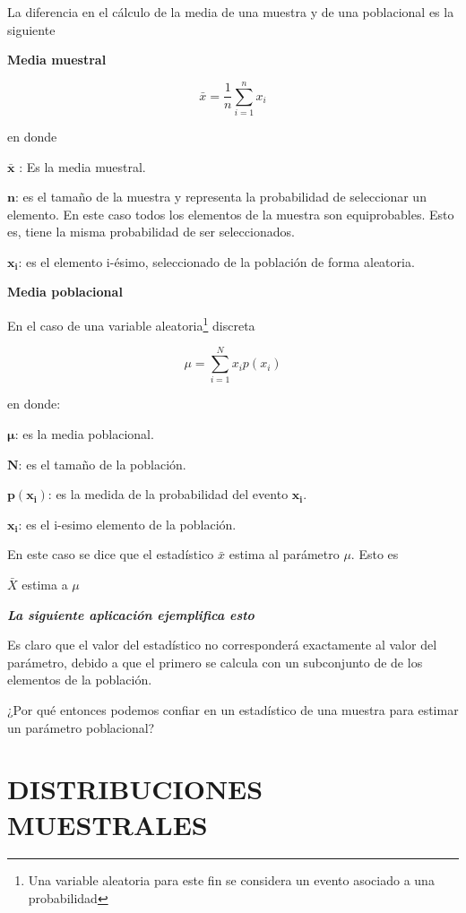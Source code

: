 \documentclass[
  oneside]{book}
\begin{document}
La diferencia en el cálculo de la media de una muestra y de una poblacional es la siguiente

\textbf{Media muestral}

\begin{equation}
\bar{x}=\frac{1}{n}\sum_{i=1}^{n}x_i
\end{equation}

en donde

\(\boldsymbol{\bar{x}}\) : Es la media muestral.

\(\boldsymbol{n}\): es el tamaño de la muestra y representa la probabilidad de seleccionar un elemento. En este caso todos los elementos de la muestra son equiprobables. Esto es, tiene la misma probabilidad de ser seleccionados.

\(\boldsymbol{x_i}\): es el elemento i-ésimo, seleccionado de la población de forma aleatoria.

\textbf{Media poblacional}

En el caso de una variable aleatoria\footnote{Una variable aleatoria para este fin se considera un evento asociado a una probabilidad} discreta

\begin{equation}
\mu=\sum_{i=1}^Nx_ip(x_i)
\end{equation}

en donde:

\(\boldsymbol{\mu}\): es la media poblacional.

\(\boldsymbol{N}\): es el tamaño de la población.

\(\boldsymbol{p(x_i)}\): es la medida de la probabilidad del evento \(\boldsymbol{x_i}\).

\(\boldsymbol{x_i}\): es el i-esimo elemento de la población.

En este caso se dice que el estadístico \(\bar{x}\) estima al parámetro \(\mu\). Esto es

\(\bar{X}\) estima a \(\mu\)

{\emph{\textbf{La siguiente aplicación ejemplifica esto}}}

Es claro que el valor del estadístico no corresponderá exactamente al valor del parámetro, debido a que el primero se calcula con un subconjunto de de los elementos de la población.

¿Por qué entonces podemos confiar en un estadístico de una muestra para estimar un parámetro poblacional?

\section{DISTRIBUCIONES MUESTRALES}\label{distribuciones-muestrales}
\end{document}
